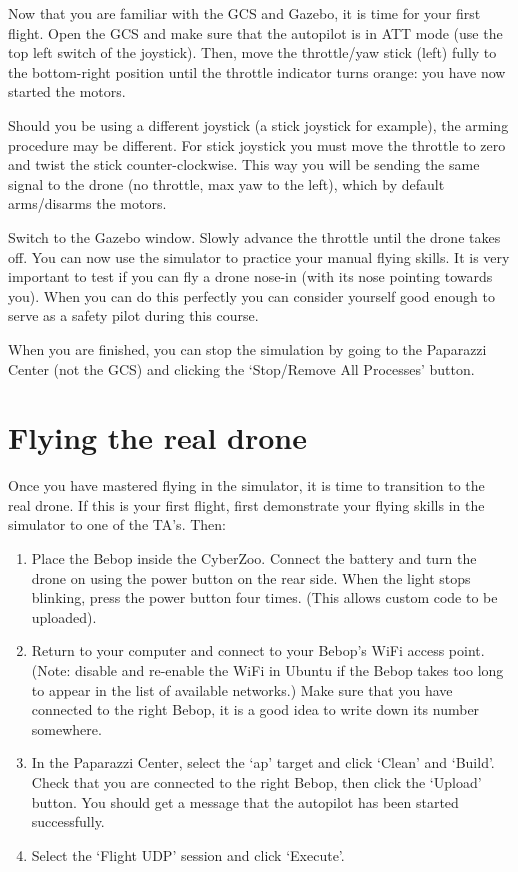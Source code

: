 Now that you are familiar with the GCS and Gazebo, it is time for your first flight.
Open the GCS and make sure that the autopilot is in ATT mode (use the top left switch of the joystick). Then, move the throttle/yaw stick (left) fully to the bottom-right position until the throttle indicator turns orange: you have now started the motors.

Should you be using a different joystick (a stick joystick for example), the arming procedure may be different. For stick joystick you must move the throttle to zero and twist the stick counter-clockwise. This way you will be sending the same signal to the drone (no throttle, max yaw to the left), which by default arms/disarms the motors.

Switch to the Gazebo window. Slowly advance the throttle until the drone takes off.
You can now use the simulator to practice your manual flying skills. It is very important to test if you can fly a drone nose-in (with its nose pointing towards you). When you can do this perfectly you can consider yourself good enough to serve as a safety pilot during this course.

When you are finished, you can stop the simulation by going to the Paparazzi Center (not the GCS) and clicking the `Stop/Remove All Processes' button.

\section{Flying the real drone}
Once you have mastered flying in the simulator, it is time to transition to the real drone.
If this is your first flight, first demonstrate your flying skills in the simulator to one of the TA's.
Then:

\begin{enumerate}
	\item Place the Bebop inside the CyberZoo. Connect the battery and turn the drone on using the power button on the rear side. When the light stops blinking, press the power button four times. (This allows custom code to be uploaded).
	\item Return to your computer and connect to your Bebop's WiFi access point. (Note: disable and re-enable the WiFi in Ubuntu if the Bebop takes too long to appear in the list of available networks.)
	Make sure that you have connected to the right Bebop, it is a good idea to write down its number somewhere.
	\item In the Paparazzi Center, select the `ap' target and click `Clean' and `Build'. Check that you are connected to the right Bebop, then click the `Upload' button. You should get a message that the autopilot has been started successfully.
	\item Select the `Flight UDP' session and click `Execute'.
\end{enumerate}

